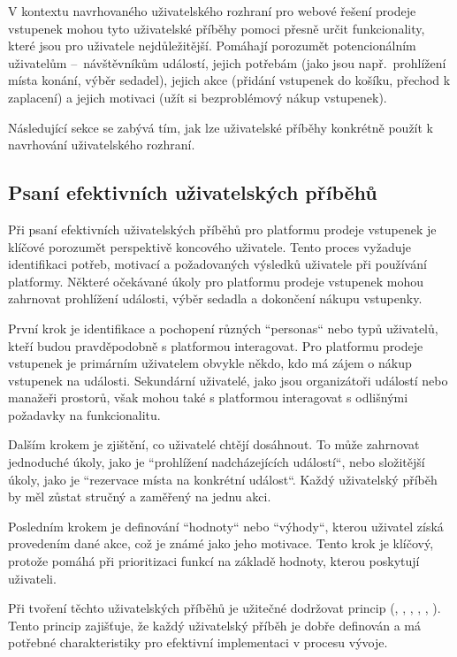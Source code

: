 V kontextu navrhovaného uživatelského rozhraní pro webové řešení prodeje vstupenek mohou tyto uživatelské příběhy pomoci přesně určit funkcionality, které jsou pro uživatele nejdůležitější.
Pomáhají porozumět potencionálním uživatelům –~návštěvníkům událostí, jejich potřebám (jako jsou např.\ prohlížení místa konání, výběr sedadel), jejich akce (přidání vstupenek do košíku, přechod k zaplacení) a jejich motivaci (užít si bezproblémový nákup vstupenek).

Následující sekce se zabývá tím, jak lze uživatelské příběhy konkrétně použít k navrhování uživatelského rozhraní.

\subsection{Psaní efektivních uživatelských příběhů}
\label{subsec:navrh-ui-uzivatelske-pribehy-psani-efektivnich}

Při psaní efektivních uživatelských příběhů pro platformu prodeje vstupenek je klíčové porozumět perspektivě koncového uživatele.
Tento proces vyžaduje identifikaci potřeb, motivací a požadovaných výsledků uživatele při používání platformy.
Některé očekávané úkoly pro platformu prodeje vstupenek mohou zahrnovat prohlížení události, výběr sedadla a dokončení nákupu vstupenky.

První krok je identifikace a pochopení různých ``personas`` nebo typů uživatelů, kteří budou pravděpodobně s platformou interagovat.
Pro platformu prodeje vstupenek je primárním uživatelem obvykle někdo, kdo má zájem o nákup vstupenek na události.
Sekundární uživatelé, jako jsou organizátoři událostí nebo manažeři prostorů, však mohou také s platformou interagovat s odlišnými požadavky na funkcionalitu.

Dalším krokem je zjištění, co uživatelé chtějí dosáhnout.
To může zahrnovat jednoduché úkoly, jako je ``prohlížení nadcházejících událostí``, nebo složitější úkoly, jako je ``rezervace místa na konkrétní událost``.
Každý uživatelský příběh by měl zůstat stručný a zaměřený na jednu akci.

Posledním krokem je definování ``hodnoty`` nebo ``výhody``, kterou uživatel získá provedením dané akce, což je známé jako jeho motivace.
Tento krok je klíčový, protože pomáhá při prioritizaci funkcí na základě hodnoty, kterou poskytují uživateli.

Při tvoření těchto uživatelských příběhů je užitečné dodržovat princip  (, , , , , ).
Tento princip zajišťuje, že každý uživatelský příběh je dobře definován a má potřebné charakteristiky pro efektivní implementaci v procesu vývoje.

